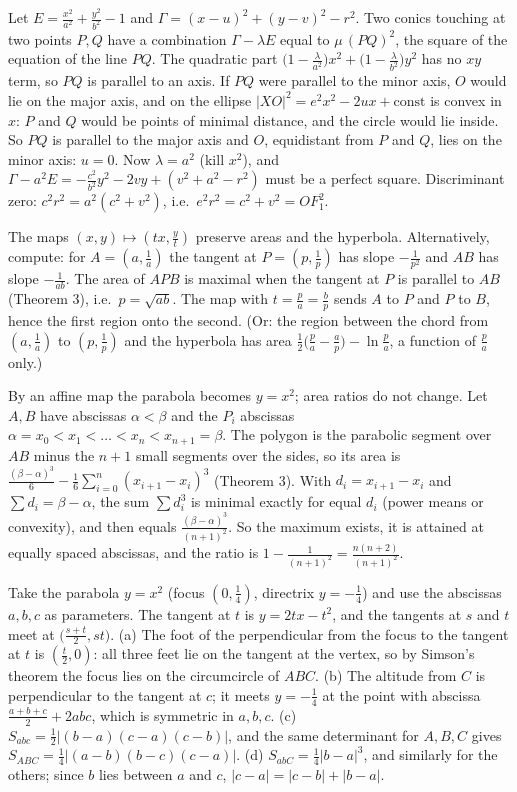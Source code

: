 \documentclass[11pt,a4paper]{article}
\begin{document}
 Let $E=\frac{x^2}{a^2}+\frac{y^2}{b^2}-1$ and $\Gamma=(x-u)^2+(y-v)^2-r^2$. Two conics touching at two points $P,Q$ have a combination $\Gamma-\lambda E$ equal to $\mu\,(PQ)^2$, the square of the equation of the line $PQ$. The quadratic part $\bigl(1-\frac\lambda{a^2}\bigr)x^2+\bigl(1-\frac\lambda{b^2}\bigr)y^2$ has no $xy$ term, so $PQ$ is parallel to an axis.
 If $PQ$ were parallel to the minor axis, $O$ would lie on the major axis, and on the ellipse $|XO|^2=e^2x^2-2ux+\mathrm{const}$ is convex in $x$: $P$ and $Q$ would be points of minimal distance, and the circle would lie inside. So $PQ$ is parallel to the major axis and $O$, equidistant from $P$ and $Q$, lies on the minor axis: $u=0$.
 Now $\lambda=a^2$ (kill $x^2$), and $\Gamma-a^2E=-\frac{c^2}{b^2}y^2-2vy+(v^2+a^2-r^2)$ must be a perfect square. Discriminant zero: $c^2r^2=a^2(c^2+v^2)$, i.e.\ $e^2r^2=c^2+v^2=OF_1^2$.

 The maps $(x,y)\mapsto(tx,\frac yt)$ preserve areas and the hyperbola. Alternatively, compute: for $A=(a,\frac1a)$ the tangent at $P=(p,\frac1p)$ has slope $-\frac1{p^2}$ and $AB$ has slope $-\frac1{ab}$.
 The area of $APB$ is maximal when the tangent at $P$ is parallel to $AB$ (Theorem 3), i.e.\ $p=\sqrt{ab}$.
 The map with $t=\frac pa=\frac bp$ sends $A$ to $P$ and $P$ to $B$, hence the first region onto the second. (Or: the region between the chord from $(a,\frac1a)$ to $(p,\frac1p)$ and the hyperbola has area $\frac12\bigl(\frac pa-\frac ap\bigr)-\ln\frac pa$, a function of $\frac pa$ only.)

 By an affine map the parabola becomes $y=x^2$; area ratios do not change. Let $A,B$ have abscissas $\alpha<\beta$ and the $P_i$ abscissas $\alpha=x_0<x_1<\dots<x_n<x_{n+1}=\beta$.
 The polygon is the parabolic segment over $AB$ minus the $n+1$ small segments over the sides, so its area is $\frac{(\beta-\alpha)^3}6-\frac16\sum_{i=0}^n(x_{i+1}-x_i)^3$ (Theorem 3).
 With $d_i=x_{i+1}-x_i$ and $\sum d_i=\beta-\alpha$, the sum $\sum d_i^3$ is minimal exactly for equal $d_i$ (power means or convexity), and then equals $\frac{(\beta-\alpha)^3}{(n+1)^2}$. So the maximum exists, it is attained at equally spaced abscissas, and the ratio is $1-\frac1{(n+1)^2}=\frac{n(n+2)}{(n+1)^2}$.

 Take the parabola $y=x^2$ (focus $(0,\frac14)$, directrix $y=-\frac14$) and use the abscissas $a,b,c$ as parameters. The tangent at $t$ is $y=2tx-t^2$, and the tangents at $s$ and $t$ meet at $\bigl(\frac{s+t}2,st\bigr)$.
 (a) The foot of the perpendicular from the focus to the tangent at $t$ is $(\frac t2,0)$: all three feet lie on the tangent at the vertex, so by Simson's theorem the focus lies on the circumcircle of $ABC$. (b) The altitude from $C$ is perpendicular to the tangent at $c$; it meets $y=-\frac14$ at the point with abscissa $\frac{a+b+c}2+2abc$, which is symmetric in $a,b,c$.
 (c) $S_{abc}=\frac12|(b-a)(c-a)(c-b)|$, and the same determinant for $A,B,C$ gives $S_{ABC}=\frac14|(a-b)(b-c)(c-a)|$. (d) $S_{abC}=\frac14|b-a|^3$, and similarly for the others; since $b$ lies between $a$ and $c$, $|c-a|=|c-b|+|b-a|$.
\end{document}
